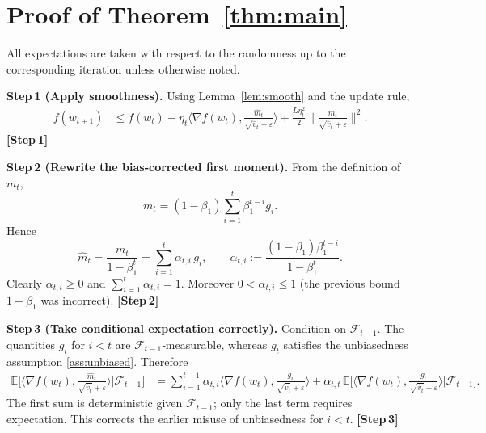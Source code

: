 \documentclass{article}
\begin{document}
\section*{Proof of Theorem~\ref{thm:main}}
All expectations are taken with respect to the randomness up to the
corresponding iteration unless otherwise noted.

\noindent\textbf{Step 1 (Apply smoothness).}  
Using Lemma~\ref{lem:smooth} and the update rule,
\begin{align}
f(w_{t+1})
&\le f(w_t)-\eta_t\Big\langle\nabla f(w_t),
      \frac{\hat m_t}{\sqrt{\hat v_t}+\varepsilon}\Big\rangle
   +\frac{L\eta_t^{2}}{2}
      \Big\|\frac{\hat m_t}{\sqrt{\hat v_t}+\varepsilon}\Big\|^{2}.
\tag{1}\label{eq:smooth}
\end{align}
\textbf{[Step 1]}

\noindent\textbf{Step 2 (Rewrite the bias‑corrected first moment).}  
From the definition of $m_t$,
\[
m_t=(1-\beta_1)\sum_{i=1}^{t}\beta_1^{t-i}g_i .
\]
Hence
\[
\hat m_t
= \frac{m_t}{1-\beta_1^{t}}
= \sum_{i=1}^{t}\alpha_{t,i}\,g_i,
\qquad
\alpha_{t,i}:=
\frac{(1-\beta_1)\beta_1^{t-i}}{1-\beta_1^{t}} .
\tag{2}\label{eq:alpha}
\]
Clearly $\alpha_{t,i}\ge0$ and $\sum_{i=1}^{t}\alpha_{t,i}=1$.
Moreover $0<\alpha_{t,i}\le 1$ (the previous bound $1-\beta_1$ was
incorrect).  
\textbf{[Step 2]}

\noindent\textbf{Step 3 (Take conditional expectation correctly).}  
Condition on $\mathcal{F}_{t-1}$.  The quantities $g_i$ for $i<t$ are
$\mathcal{F}_{t-1}$‑measurable, whereas $g_t$ satisfies the unbiasedness
assumption \ref{ass:unbiased}.  Therefore
\begin{align}
\mathbb{E}\!\Big[\Big\langle\nabla f(w_t),
      \frac{\hat m_t}{\sqrt{\hat v_t}+\varepsilon}\Big\rangle
      \Big|\mathcal{F}_{t-1}\Big]
&=\sum_{i=1}^{t-1}\alpha_{t,i}
   \Big\langle\nabla f(w_t),\frac{g_i}{\sqrt{\hat v_t}+\varepsilon}\Big\rangle
   +\alpha_{t,t}\,
   \mathbb{E}\!\Big[\Big\langle\nabla f(w_t),
      \frac{g_t}{\sqrt{\hat v_t}+\varepsilon}\Big\rangle\Big|\mathcal{F}_{t-1}\Big].
\tag{3}\label{eq:condexp}
\end{align}
The first sum is deterministic given $\mathcal{F}_{t-1}$; only the last
term requires expectation.  This corrects the earlier misuse of
unbiasedness for $i<t$.  
\textbf{[Step 3]}
\end{document}
